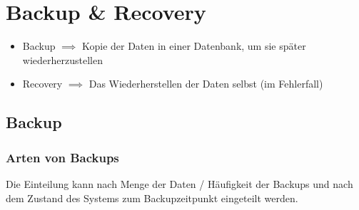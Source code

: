 \section{Backup \& Recovery}

\begin{itemize}
    \item Backup $\implies$ Kopie der Daten in einer Datenbank, um sie später wiederherzustellen
    \item Recovery $\implies$ Das Wiederherstellen der Daten selbst (im Fehlerfall)
\end{itemize}

\subsection{Backup}

\subsubsection{Arten von Backups}
Die Einteilung kann nach Menge der Daten / Häufigkeit der Backups und nach dem Zustand des Systems zum Backupzeitpunkt eingeteilt werden.
